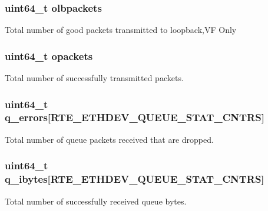 \subsubsection[{olbpackets}]{\setlength{\rightskip}{0pt plus 5cm}uint64\+\_\+t olbpackets}\label{structrte__eth__stats_a7c29127c73fd1f620335984959f7deff}
Total number of good packets transmitted to loopback,V\+F Only \hypertarget{structrte__eth__stats_a6e7706a96b1ff8a262652a554b4823b2}{}
\subsubsection[{opackets}]{\setlength{\rightskip}{0pt plus 5cm}uint64\+\_\+t opackets}\label{structrte__eth__stats_a6e7706a96b1ff8a262652a554b4823b2}
Total number of successfully transmitted packets. \hypertarget{structrte__eth__stats_aaf39205f9c73f5b800cde7ccdadda59e}{}
\subsubsection[{q\+\_\+errors}]{\setlength{\rightskip}{0pt plus 5cm}uint64\+\_\+t q\+\_\+errors\mbox{[}R\+T\+E\+\_\+\+E\+T\+H\+D\+E\+V\+\_\+\+Q\+U\+E\+U\+E\+\_\+\+S\+T\+A\+T\+\_\+\+C\+N\+T\+R\+S\mbox{]}}\label{structrte__eth__stats_aaf39205f9c73f5b800cde7ccdadda59e}
Total number of queue packets received that are dropped. \hypertarget{structrte__eth__stats_a90f0b86c63ff4ba82d191030f29a9dcf}{}
\subsubsection[{q\+\_\+ibytes}]{\setlength{\rightskip}{0pt plus 5cm}uint64\+\_\+t q\+\_\+ibytes\mbox{[}R\+T\+E\+\_\+\+E\+T\+H\+D\+E\+V\+\_\+\+Q\+U\+E\+U\+E\+\_\+\+S\+T\+A\+T\+\_\+\+C\+N\+T\+R\+S\mbox{]}}\label{structrte__eth__stats_a90f0b86c63ff4ba82d191030f29a9dcf}
Total number of successfully received queue bytes. \hypertarget{structrte__eth__stats_ad9a5051f6330c0125a3d6d7faf0a01bc}{}
